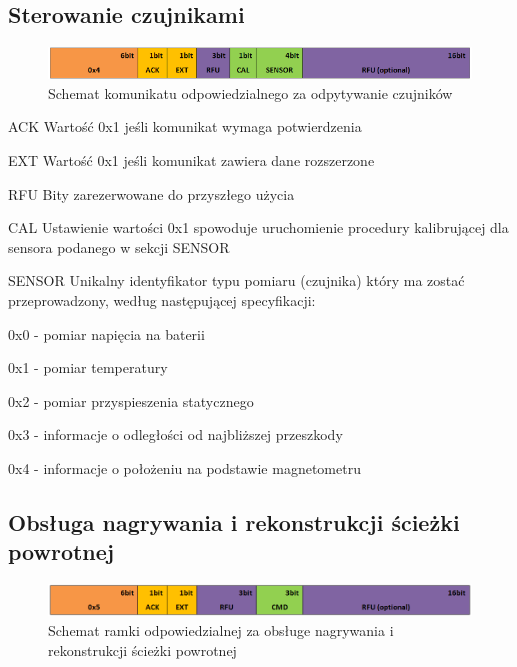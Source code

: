 \subsection{Sterowanie czujnikami}
\begin{figure}[h!] 
 \centering
 \includegraphics[width=\textwidth]{../images/appendix/cmd_0x04.png}
 \caption{Schemat komunikatu odpowiedzialnego za odpytywanie czujników}
 \label{fig:CMD_0x04}
\end{figure}

\begin{basedescript}{\desclabelstyle{\pushlabel}\desclabelwidth{25mm}}
\setlength{\parsep}{0pt}
\setlength{\itemsep}{0mm}
\setlength{\parskip}{0pt}
\item[ACK]
	Wartość 0x1 jeśli komunikat wymaga potwierdzenia
\item[EXT] 
	Wartość 0x1 jeśli komunikat zawiera dane rozszerzone
\item[RFU] 
	Bity zarezerwowane do przyszłego użycia
\item[CAL] 
	Ustawienie wartości 0x1 spowoduje uruchomienie procedury kalibrującej
	dla sensora podanego w sekcji SENSOR
\item[SENSOR] 
	Unikalny identyfikator typu pomiaru (czujnika) który ma zostać przeprowadzony,
	według następującej specyfikacji:
	\begin{desc}
	\item[0x0] - pomiar napięcia na baterii
	\item[0x1] - pomiar temperatury
	\item[0x2] - pomiar przyspieszenia statycznego
	\item[0x3] - informacje o odległości od najbliższej przeszkody
	\item[0x4] - informacje o położeniu na podstawie magnetometru
	\end{desc}
\end{basedescript}

\subsection{Obsługa nagrywania i rekonstrukcji ścieżki powrotnej}
\begin{figure}[h!]
 \centering
 \includegraphics[width=\textwidth]{../images/appendix/cmd_0x05.png}
 \caption{Schemat ramki odpowiedzialnej za obsługe nagrywania i rekonstrukcji ścieżki powrotnej}
 \label{fig:CMD_0x05}
\end{figure}

